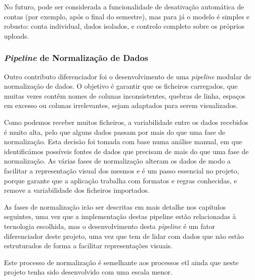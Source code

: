 No futuro, pode ser considerada a funcionalidade de desativação automática de contas (por exemplo, após o final do semestre), mas para já o modelo é simples e robusto: conta individual, dados isolados, e controlo completo sobre os próprios uploads.

\subsubsection{\textit{Pipeline} de Normalização de Dados}

Outro contributo diferenciador foi o desenvolvimento de uma \textit{pipeline} modular de normalização de dados. O objetivo é garantir que os ficheiros carregados, que muitas vezes contêm nomes de colunas inconsistentes, quebras de linha, espaços em excesso ou colunas irrelevantes, sejam adaptados para serem visualizados. 

Como podemos receber muitos ficheiros, a variabilidade entre os dados recebidos é muito alta, pelo que alguns dados passam por mais do que uma fase de normalização. Esta decisão foi tomada com base numa análise manual, em que identificámos possíveis fontes de dados que precisam de mais do que uma fase de normalização. As várias fases de normalização alteram os dados de modo a facilitar a representação visual dos mesmos e é um passo essencial no projeto, porque garante que a aplicação trabalha com formatos e regras conhecidas, e remove a variabilidade dos ficheiros importados.

As fases de normalização irão ser descritas em mais detalhe nos capítulos seguintes, uma vez que a implementação destas pipeline estão relacionadas à tecnologia escolhida, mas o desenvolvimento desta \textit{pipeline} é um fator diferenciador deste projeto, uma vez que tem de lidar com dados que não estão estruturados de forma a facilitar representações visuais. 

Este processo de normalização é semelhante aos processos \gls{etl} ainda que neste projeto tenha sido desenvolvido com uma escala menor.

